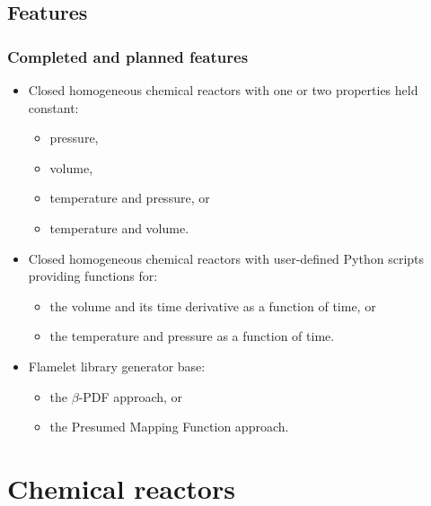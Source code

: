 \documentclass{beamer}
\begin{document}
\subsection{Features}
\begin{frame}
\frametitle{Completed and planned features}
\begin{itemize}
  \item Closed homogeneous chemical reactors with one or two properties held constant:
  \begin{itemize}
    \item pressure,
    \item volume,
    \item temperature and pressure, or
    \item temperature and volume.
  \end{itemize} 
  \item \textcolor{light-gray}{Closed homogeneous chemical reactors with user-defined Python scripts providing functions for:}
  \begin{itemize}
    \item \textcolor{light-gray}{the volume and its time derivative as a function of time, or}
    \item \textcolor{light-gray}{the temperature and pressure as a function of time.}
  \end{itemize}
  \item \textcolor{light-gray}{Flamelet library generator base:}
  \begin{itemize}
    \item \textcolor{light-gray}{the $\beta$-PDF approach, or}
    \item \textcolor{light-gray}{the Presumed Mapping Function approach}.
  \end{itemize}
\end{itemize} 
\end{frame}

\section{Chemical reactors}
\end{document}

